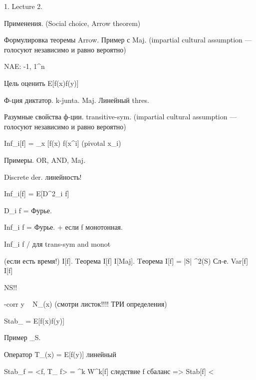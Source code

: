 1. Lecture 2.

Применения. (Social choice, Arrow theorem)

Формулировка теоремы Arrow. Пример с Maj. (impartial cultural assumption --- голосуют независимо и равно вероятно)

NAE: {-1, 1}^n 

Цель оценить E[f(x)f(y)]




Ф-ция диктатор. k-junta. Maj. Линейный thres.


Разумные свойства ф-ции. transitive-sym. (impartial cultural assumption --- голосуют независимо и равно вероятно)

Inf_i[f] = \Pr\limits_{x} [f(x) \neq f(x^{\oplus i}] (pivotal x_i)

Примеры. OR, AND, Maj.


Discrete der. линейность!

Inf_i[f] = E[D^2_i f]


D_i f = Фурье.


Inf_i f = Фурье. + если f монотонная.


Inf_i f  /  для trans-sym and monot



(если есть время!)
I[f].
Tеорема I[f] \le I[Maj].
Tеорема I[f] = \sum |S| ^2(S)  Сл-е. Var[f] \le I[f]



NS!!

\rho-corr y ~ N_\rho (x) (смотри листок!!!! ТРИ определения)

Stab_{\rho} = E[f(x)f(y)]

Пример \chi_S.


Оператор T_{\rho}(x) = E[f(y)] линейный


Stab_{f} = <f, T_{\rho} f> = \sum \rho^k W^k[f]
следствие f сбаланс => Stab[f] < \rho

